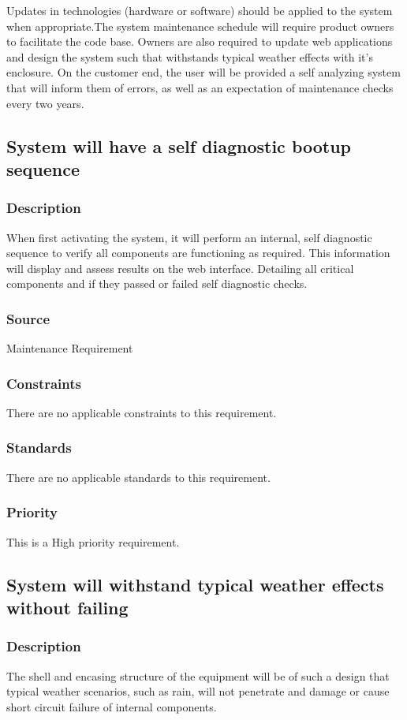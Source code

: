 Updates in technologies (hardware or software) should be applied to the system when appropriate.The system maintenance schedule will require product owners to facilitate the code base. Owners are also required to update web applications and design the system such that withstands typical weather effects with it's enclosure. On the customer end, the user will be provided a self analyzing system that will inform them of errors, as well as an expectation of maintenance checks every two years.

\subsection{System will have a self diagnostic bootup sequence}
\subsubsection{Description}
When first activating the system, it will perform an internal, self diagnostic sequence to verify all components are functioning as required. This information will display and assess results on the web interface. Detailing all critical components and if they passed or failed self diagnostic checks.
\subsubsection{Source}
Maintenance Requirement
\subsubsection{Constraints}
There are no applicable constraints to this requirement.
\subsubsection{Standards}
There are no applicable standards to this requirement.
\subsubsection{Priority}
This is a High priority requirement.

\subsection{System will withstand typical weather effects without failing}
\subsubsection{Description}
The shell and encasing structure of the equipment will be of such a design that typical weather scenarios, such as rain, will not penetrate and damage or cause short circuit failure of internal components.
